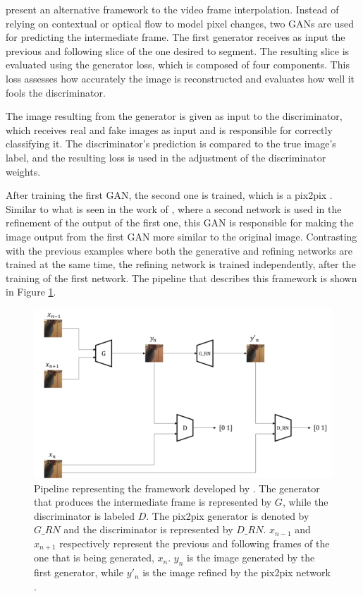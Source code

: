 \textcite{Tran2020} present an alternative framework to the video frame interpolation. Instead of relying on contextual or optical flow to model pixel changes, two GANs are used for predicting the intermediate frame. The first generator receives as input the previous and following slice of the one desired to segment. The resulting slice is evaluated using the generator loss, which is composed of four components. This loss assesses how accurately the image is reconstructed and evaluates how well it fools the discriminator.
\par
The image resulting from the generator is given as input to the discriminator, which receives real and fake images as input and is responsible for correctly classifying it. The discriminator's prediction is compared to the true image's label, and the resulting loss is used in the adjustment of the discriminator weights.
\par
After training the first GAN, the second one is trained, which is a pix2pix \parencite{Isola2017}. Similar to what is seen in the work of \textcite{Gambini2024, Huang2022}, where a second network is used in the refinement of the output of the first one, this GAN is responsible for making the image output from the first GAN more similar to the original image. Contrasting with the previous examples where both the generative and refining networks are trained at the same time, the refining network is trained independently, after the training of the first network. The pipeline that describes this framework is shown in Figure \ref{fig:VideoGANFramework}.

\begin{figure}
	\centering
	\includegraphics[width=1.0\linewidth]{figures/VideoGANFramework}
	\caption{Pipeline representing the framework developed by \textcite{Tran2020}. The generator that produces the intermediate frame is represented by $G$, while the discriminator is labeled $D$. The pix2pix generator is denoted by $G\_RN$ and the discriminator is represented by $D\_RN$. $x_{n-1}$ and $x_{n+1}$ respectively represent the previous and following frames of the one that is being generated, $x_{n}$. $y_{n}$ is the image generated by the first generator, while $y'_{n}$ is the image refined by the pix2pix network \parencite{Tran2020}.}
	\label{fig:VideoGANFramework}
\end{figure}
